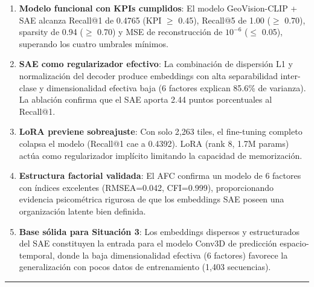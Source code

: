 \documentclass[10pt,a4paper,twocolumn]{article}
\begin{document}
\begin{enumerate}[nosep, leftmargin=*, itemsep=2pt]
  \item \textbf{Modelo funcional con KPIs cumplidos}: El modelo GeoVision-CLIP + SAE alcanza Recall@1 de 0.4765 (KPI $\geq$ 0.45), Recall@5 de 1.00 ($\geq$ 0.70), sparsity de 0.94 ($\geq$ 0.70) y MSE de reconstrucción de $10^{-6}$ ($\leq$ 0.05), superando los cuatro umbrales mínimos.
  \item \textbf{SAE como regularizador efectivo}: La combinación de dispersión L1 y normalización del decoder produce embeddings con alta separabilidad inter-clase y dimensionalidad efectiva baja (6 factores explican 85.6\% de varianza). La ablación confirma que el SAE aporta 2.44 puntos porcentuales al Recall@1.
  \item \textbf{LoRA previene sobreajuste}: Con solo 2,263 tiles, el fine-tuning completo colapsa el modelo (Recall@1 cae a 0.4392). LoRA (rank 8, 1.7M params) actúa como regularizador implícito limitando la capacidad de memorización.
  \item \textbf{Estructura factorial validada}: El AFC confirma un modelo de 6 factores con índices excelentes (RMSEA=0.042, CFI=0.999), proporcionando evidencia psicométrica rigurosa de que los embeddings SAE poseen una organización latente bien definida.
  \item \textbf{Base sólida para Situación 3}: Los embeddings dispersos y estructurados del SAE constituyen la entrada para el modelo Conv3D de predicción espacio-temporal, donde la baja dimensionalidad efectiva (6 factores) favorece la generalización con pocos datos de entrenamiento (1,403 secuencias).
\end{enumerate}

\vspace{0.1cm}
\noindent\rule{\columnwidth}{0.3pt}
\vspace{0.15cm}
\end{document}
